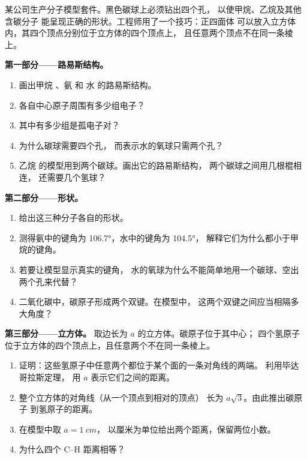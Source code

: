 \begin{problem}
\label{pb:g10:lewis-and-shape:1}
某公司生产分子模型套件。黑色碳球上必须钻出四个孔，
以使甲烷、乙烷及其他含碳分子
能呈现正确的形状。工程师用了一个技巧：正四面体
可以放入立方体内，其四个顶点分别位于立方体的四个顶点上，
且任意两个顶点不在同一条棱上。

\medskip
\noindent\textbf{第一部分——路易斯结构。}
\begin{enumerate}
  \item 画出甲烷 、氨  和
        水  的路易斯结构。
  \item 各自中心原子周围有多少组电子？
  \item 其中有多少组是孤电子对？
  \item 为什么碳球需要四个孔，
        而表示水的氧球只需两个孔？
  \item 乙烷  的模型用到两个碳球。画出它的路易斯结构，
        两个碳球之间用几根棍相连，
        还需要几个氢球？
\end{enumerate}

\medskip
\noindent\textbf{第二部分——形状。}
\begin{enumerate}[resume]
  \item 给出这三种分子各自的形状。
  \item 测得氨中的键角为 \ang{106.7}，水中的键角为 \ang{104.5}，
        解释它们为什么都小于甲烷的键角。
  \item 若要让模型显示真实的键角，
        水的氧球为什么不能简单地用一个碳球、空出两个孔来代替？
  \item 二氧化碳中，碳原子形成两个双键。在模型中，
        这两个双键之间应当相隔多大角度？
\end{enumerate}

\medskip
\noindent\textbf{第三部分——立方体。}
取边长为 $a$ 的立方体。碳原子位于其中心；
四个氢原子位于立方体的四个顶点上，且任意两个不在同一条棱上。
\begin{enumerate}[resume]
  \item 证明：这些氢原子中任意两个都位于某个面的一条对角线的两端。
        利用毕达哥拉斯定理，
        用 $a$ 表示它们之间的距离。
  \item 整个立方体的对角线（从一个顶点到相对的顶点）
        长为 $a\sqrt{3}$。由此推出碳原子
        到氢原子的距离。
  \item 在模型中取 $a = \qty{1}{cm}$，
        以厘米为单位给出两个距离，保留两位小数。
  \item 为什么四个 C--H 距离相等？
\end{enumerate}


\end{problem}
